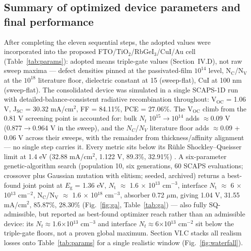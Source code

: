 \documentclass[aip,amsmath,amssymb,preprint]{revtex4-2}
\begin{document}
\subsection{Summary of optimized device parameters and final performance}
After completing the eleven sequential steps, the adopted values were incorporated into the proposed FTO/\allowbreak{}TiO$_{2}$/RbGeI$_{3}$/CuI/\allowbreak{}Au cell (Table~\ref{tab:params}): adopted means triple-gate values (Section~IV.D), not raw sweep maxima --- defect densities pinned at the passivated-film $10^{14}$ level, N$_{\mathrm{C}}$/N$_{\mathrm{V}}$ at the $10^{18}$ literature floor, dielectric constant at 15 (sweep-flat), CuI at 100 nm (sweep-flat). The consolidated device was simulated in a single SCAPS-1D run with detailed-balance-consistent radiative recombination throughout: V$_{\mathrm{OC}}$ = 1.06 V, J$_{\mathrm{SC}}$ = 30.32 mA/cm$^{2}$, FF = 84.11\%, PCE = 27.06\%. The V$_{\mathrm{OC}}$ climb from the 0.81 V screening point is accounted for: bulk $N_{t}$ $10^{15}$$\rightarrow$$10^{14}$ adds $\approx$0.09 V (0.877$\rightarrow$0.964 V in the sweep), and the $N_{C}$/$N_{V}$ literature floor adds $\approx$0.09 + 0.06 V across their sweeps, with the remainder from thickness/affinity alignment --- no single step carries it. Every metric sits below its R\"uhle Shockley--Queisser limit at 1.4 eV (32.88 mA/cm$^{2}$, 1.122 V, 89.3\%, 32.91\%) \cite{r36}. A six-parameter genetic-algorithm search (population 10, six generations, 60 SCAPS evaluations; crossover plus Gaussian mutation with elitism; seeded, archived) returns a best-found joint point at $E_{\mathrm{g}}$ = 1.36 eV, $N_{\mathrm{t}}$ $\approx$ 1.6 $\times$ 10$^{13}$ cm$^{-3}$, interface $N_{\mathrm{t}}$ $\approx$ 6 $\times$ 10$^{13}$ cm$^{-2}$, N$_{\mathrm{C}}$/N$_{\mathrm{V}}$ $\approx$ 1.6 $\times$ 10$^{18}$ cm$^{-3}$, absorber 0.72 $\mu$m, giving 1.04 V, 31.55 mA/cm$^{2}$, 85.87\%, 28.30\% (Fig.~\ref{fig:ga}, Table~\ref{tab:ga}) --- also fully SQ-admissible, but reported as best-found optimizer reach rather than an admissible device: its $N_{t}$$\approx$1.6$\times$10$^{13}$ cm$^{-3}$ and interface $N_{t}$$\approx$6$\times$10$^{13}$ cm$^{-2}$ sit below the triple-gate floors, not a proven global maximum. Section VI.C stacks all realism losses onto Table~\ref{tab:params} for a single realistic window (Fig.~\ref{fig:waterfall}).
\end{document}
